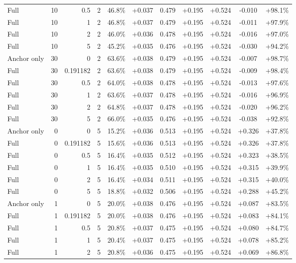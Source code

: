 \begin{table}[htbp]
\begin{tabular}{lrrrccccccc}
Full & 10 & 0.5 & 2 & 46.8\% & +0.037 & 0.479 & +0.195 & +0.524 & -0.010 & +98.1\% \\
Full & 10 & 1 & 2 & 46.8\% & +0.037 & 0.479 & +0.195 & +0.524 & -0.011 & +97.9\% \\
Full & 10 & 2 & 2 & 46.0\% & +0.036 & 0.478 & +0.195 & +0.524 & -0.016 & +97.0\% \\
Full & 10 & 5 & 2 & 45.2\% & +0.035 & 0.476 & +0.195 & +0.524 & -0.030 & +94.2\% \\
Anchor only & 30 & 0 & 2 & 63.6\% & +0.038 & 0.479 & +0.195 & +0.524 & -0.007 & +98.7\% \\
Full & 30 & 0.191182 & 2 & 63.6\% & +0.038 & 0.479 & +0.195 & +0.524 & -0.009 & +98.4\% \\
Full & 30 & 0.5 & 2 & 64.0\% & +0.038 & 0.478 & +0.195 & +0.524 & -0.013 & +97.6\% \\
Full & 30 & 1 & 2 & 63.6\% & +0.037 & 0.478 & +0.195 & +0.524 & -0.016 & +96.9\% \\
Full & 30 & 2 & 2 & 64.8\% & +0.037 & 0.478 & +0.195 & +0.524 & -0.020 & +96.2\% \\
Full & 30 & 5 & 2 & 66.0\% & +0.035 & 0.476 & +0.195 & +0.524 & -0.038 & +92.8\% \\
Anchor only & 0 & 0 & 5 & 15.2\% & +0.036 & 0.513 & +0.195 & +0.524 & +0.326 & +37.8\% \\
Full & 0 & 0.191182 & 5 & 15.6\% & +0.036 & 0.513 & +0.195 & +0.524 & +0.326 & +37.8\% \\
Full & 0 & 0.5 & 5 & 16.4\% & +0.035 & 0.512 & +0.195 & +0.524 & +0.323 & +38.5\% \\
Full & 0 & 1 & 5 & 16.4\% & +0.035 & 0.510 & +0.195 & +0.524 & +0.315 & +39.9\% \\
Full & 0 & 2 & 5 & 16.4\% & +0.034 & 0.511 & +0.195 & +0.524 & +0.315 & +40.0\% \\
Full & 0 & 5 & 5 & 18.8\% & +0.032 & 0.506 & +0.195 & +0.524 & +0.288 & +45.2\% \\
Anchor only & 1 & 0 & 5 & 20.0\% & +0.038 & 0.476 & +0.195 & +0.524 & +0.087 & +83.5\% \\
Full & 1 & 0.191182 & 5 & 20.0\% & +0.038 & 0.476 & +0.195 & +0.524 & +0.083 & +84.1\% \\
Full & 1 & 0.5 & 5 & 20.8\% & +0.037 & 0.475 & +0.195 & +0.524 & +0.080 & +84.7\% \\
Full & 1 & 1 & 5 & 20.4\% & +0.037 & 0.475 & +0.195 & +0.524 & +0.078 & +85.2\% \\
Full & 1 & 2 & 5 & 20.8\% & +0.036 & 0.475 & +0.195 & +0.524 & +0.069 & +86.8\% \\

\end{tabular}
\end{table}
